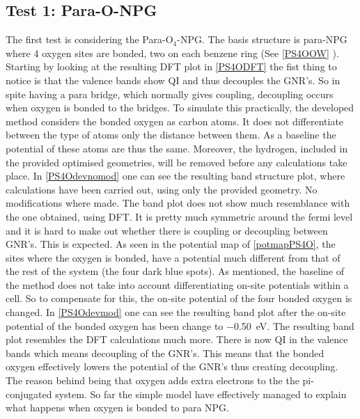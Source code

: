 \subsection{Test 1: Para-O-NPG}
The first test is considering the Para-O\(_4\)-NPG. The basis structure is para-NPG where 4 oxygen sites are bonded, two on each benzene ring (See \cref{PS4OOW} ). Starting by looking at the resulting DFT plot in \cref{PS4ODFT} the fist thing to notice is that the valence bands show QI and thus decouples the GNR's. So in spite having a para bridge, which normally gives coupling, decoupling occurs when oxygen is bonded to the bridges. To simulate this practically, the developed method considers the bonded oxygen as carbon atoms. It does not differentiate between the type of atoms only the distance between them. As a baseline the potential of these atoms are thus the same. Moreover, the hydrogen, included in the provided optimised geometries, will be removed before any calculations take place. In \cref{PS4Odevnomod} one can see the resulting band structure plot, where calculations have been carried out, using only the provided geometry. No modifications where made. The band plot does not show much resemblance with the one obtained, using DFT. It is pretty much symmetric around the fermi level and it is hard to make out whether there is coupling or decoupling between GNR's. This is expected. As seen in the potential map of \cref{potmapPS4O}, the sites where the oxygen is bonded, have a potential much different from that of the rest of the system (the four dark blue spots). As mentioned, the baseline of the method does not take into account differentiating on-site potentials within a cell. So to compensate for this, the on-site potential of the four bonded oxygen is changed. In \cref{PS4Odevmod} one can see the resulting band plot after the on-site potential of the bonded oxygen has been change to \SI{-0.50}{\electronvolt}. The resulting band plot resembles the DFT calculations much more. There is now QI in the valence bands which means decoupling of the GNR's. This means that the bonded oxygen effectively lowers the potential of the GNR's thus creating decoupling. The reason behind being that oxygen adds extra electrons to the the pi-conjugated system. So far the simple model have effectively managed to explain what happens when oxygen is bonded to para NPG. 
